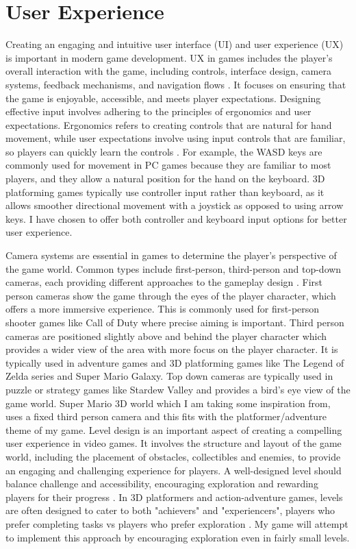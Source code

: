 \documentclass[]{final_report}
\begin{document}
\section{User Experience}\label{userexperience}
Creating an engaging and intuitive user interface (UI) and user experience (UX) is important in modern game development. 
UX in games includes the player's overall interaction with the game, including controls, interface design, camera systems, feedback mechanisms, and navigation flows \cite{Kramarzewski2023}. It focuses on ensuring that the game is enjoyable, accessible, and meets player expectations. 
\newline Designing effective input involves adhering to the principles of ergonomics and user expectations. Ergonomics refers to creating controls that are natural for hand movement, while user expectations involve using input controls that are familiar, so players can quickly learn the controls \cite{Rogers2014}. For example, the WASD keys are commonly used for movement in PC games because they are familiar to most players, and they allow a natural position for the hand on the keyboard. 3D platforming games typically use controller input rather than keyboard, as it allows smoother directional movement with a joystick as opposed to using arrow keys. I have chosen to offer both controller and keyboard input options for better user experience. \newline

Camera systems are essential in games to determine the player's perspective of the game world. Common types include first-person, third-person and top-down cameras, each providing different approaches to the gameplay design \cite{Kramarzewski2023}. First person cameras show the game through the eyes of the player character, which offers a more immersive experience. This is commonly used for first-person shooter games like Call of Duty where precise aiming is important. Third person cameras are positioned slightly above and behind the player character which provides a wider view of the area with more focus on the player character. It is typically used in adventure games and 3D platforming games like The Legend of Zelda series and Super Mario Galaxy. Top down cameras are typically used in puzzle or strategy games like Stardew Valley and provides a bird's eye view of the game world. Super Mario 3D world which I am taking some inspiration from, uses a fixed third person camera and this fits with the platformer/adventure theme of my game. \newline
Level design is an important aspect of creating a compelling user experience in video games. It involves the structure and layout of the game world, including the placement of obstacles, collectibles and enemies, to provide an engaging and challenging experience for players. A well-designed level should balance challenge and accessibility, encouraging exploration and rewarding players for their progress \cite{Kramarzewski2023}. In 3D platformers and action-adventure games, levels are often designed to cater to both "achievers" and "experiencers", players who prefer completing tasks vs players who prefer exploration \cite{zhao2022dynamic}.  My game will attempt to implement this approach by encouraging exploration even in fairly small levels.
\end{document}
